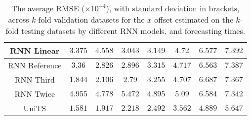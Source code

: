 \begin{table}[!ht]
{\begin{tabular}{|c|c|c|c|c|c|c|c|}
			RNN Linear & $3.375$ & $4.558$ & $3.043$ & $3.149$ & $4.72$ & $6.577$ & $7.392$ \\ \hline
			RNN Reference & $3.36$ & $2.826$ & $2.896$ & $3.315$ & $4.717$ & $6.563$ & $7.387$ \\ \hline
			RNN Third & $1.844$ & $2.106$ & $2.79$ & $3.255$ & $4.707$ & $6.687$ & $7.367$ \\ \hline
			RNN Twice & $4.955$ & $4.778$ & $5.472$ & $4.895$ & $5.09$ & $6.584$ & $7.342$ \\ \hline
			UniTS & $1.581$ & $1.917$ & $\mathbf{2.218}$ & $\mathbf{2.492}$ & $\mathbf{3.562}$ & $\mathbf{4.889}$ & $\mathbf{5.647}$ \\ \hline
		\end{tabular}
	}
	\caption{The average RMSE ($\times 10^{-4}$), with standard deviation in brackets, across $k$-fold validation datasets for the $x$ offset estimated on the $k$-fold testing datasets by different RNN models, and forecasting times.}
	\label{tab:all_longitude_no_abs_RMSE}
\end{table}